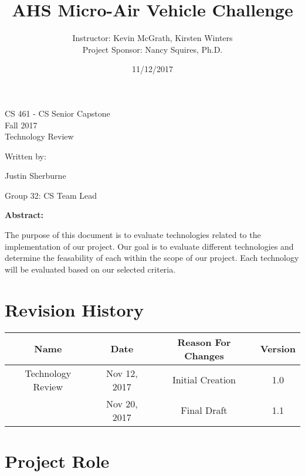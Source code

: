 \documentclass[letterpaper, 10, draftclsnofoot, onecolumn, compsoc]{IEEEtran}
\date{11/12/2017}
\title{AHS Micro-Air Vehicle Challenge}
\author{ Instructor: Kevin McGrath, Kirsten Winters \\
    Project Sponsor: Nancy Squires, Ph.D.}
\def\class{CS 461 - CS Senior Capstone}
\def\term{Fall 2017}
\begin{document}
\null  %
\nointerlineskip  %
\vfill
\let\snewpage \newpage
\let\newpage \relax
\maketitle
\begin{center}
\class\\
\term\\
\huge{Technology Review}\par
\vspace{2mm}
\large{Written by:}\par
\normalsize{Justin Sherburne}\par
\normalsize{Group 32: CS Team Lead} \par
\vspace{8mm}


\large{\textbf{Abstract:}}\par 
\vspace{2mm}
\end{center}
\par
\normalsize{The purpose of this document is to evaluate technologies related to 
the implementation of our project. Our goal is to evaluate different technologies 
and determine the feasability of each within the scope of our project. Each 
technology will be evaluated based on our selected criteria.  
}

\let \newpage \snewpage
\vfill 
\break %

\tableofcontents


\section*{Revision History}

\begin{center}
    \begin{tabular}{|c|c|c|c|}
        \hline
		Name & Date & Reason For Changes & Version\\
        \hline
		Technology Review & Nov 12, 2017 & Initial Creation & 1.0\\
        \hline
		& Nov 20, 2017 & Final Draft & 1.1\\
	\hline 
    \end{tabular}
\end{center}

\section{Project Role}
\end{document}
